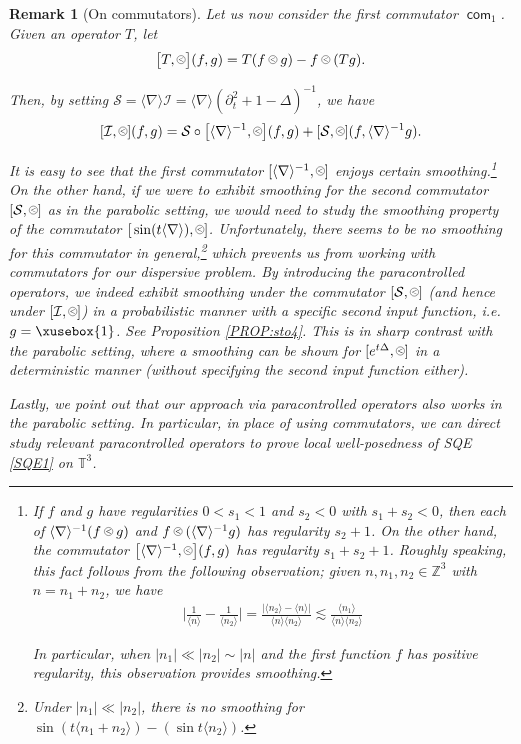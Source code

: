 \documentclass[%
11pt,  reqno]{amsart}
\def\<#1>{\xusebox{#1}}
\newcommand{\pl}{\mathbin{\scaleobj{0.7}{\tikz \draw (0,0) node[shape=circle,draw,inner sep=0pt,minimum size=8.5pt] {\scriptsize $<$};}}}
\newtheorem{remark}[theorem]{Remark}
\newcommand{\1}{\hspace{0.2mm}\text{I}\hspace{0.2mm}}
\newcommand{\noi}{\noindent}
\newcommand{\Z}{\mathbb{Z}}
\newcommand{\T}{\mathbb{T}}
\DeclareMathOperator{\com}{\textsf{com}}
\newcommand{\nb}{\nabla}
\newcommand{\Dl}{\Delta}
\newcommand{\dt}{\partial_t}
\newcommand{\les}{\lesssim}
\newcommand{\jb}[1]
{\langle #1 \rangle}
\renewcommand{\S}{\mathcal{S}}
\newcommand{\I}{\mathcal{I}}
\numberwithin{equation}{section}
\numberwithin{theorem}{section}
\begin{document}
\begin{remark}[On commutators]
Let us now consider the first commutator $\com_1$.
Given an operator $T$, 
let 
\begin{align*}
\big[T, \pl\big](f, g) =T(f\pl g) - f\pl (T g).
\end{align*}

\noi
Then, 
by setting   $\S = \jb{\nb} \I = \jb{\nb} (\dt^2 + 1 - \Dl)^{-1}$, 
we have
\[ [\I, \pl](f, g) = \S \circ \big[\jb{\nb}^{-1}, \pl\big](f, g) + [\S, \pl] (f,  \jb{\nb}^{-1}g).\]

\noi
It is easy to see that the first commutator 
$[ \jb{\nb}^{-1}, \pl]$ enjoys certain smoothing.\footnote{If $f$ and $g$ have regularities $0 < s_1 < 1$ and $s_2<0$ with  $s_1 + s_2 < 0$, 
then each of $\jb{\nb}^{-1}(f \pl g)$ and $f \pl (\jb{\nb}^{-1}g)$
has 
regularity $s_2 + 1$.
On the other hand, the commutator $\big[\jb{\nb}^{-1}, \pl\big](f, g)$
has regularity $s_1 + s_2 + 1$.
Roughly speaking, this fact follows from the following observation;
given $n, n_1, n_2 \in \Z^3$ with  $n = n_1 + n_2$, we have
\begin{align*}
\bigg|\frac{1}{\jb{n}} - \frac{1}{\jb{n_2}}\bigg|
= \frac{\big|\jb{n_2} - \jb{n}\big|}{\jb{n}\jb{n_2}}
\les \frac{\jb{n_1}}{\jb{n}\jb{n_2}}
\end{align*}

\noi
In particular, when $|n_1| \ll |n_2| \sim |n|$
and the first function $f$ has positive regularity, 
this observation provides  smoothing.
}
On the other hand, 
if we were to exhibit smoothing 
for  the second commutator $[\S, \pl]$ as in the parabolic setting, 
we would need to study the smoothing property
of the commutator $[ \,\sin(t \jb{\nb}), \pl]$.
Unfortunately, there seems to be no smoothing
for this commutator in general,\footnote{Under $|n_1| \ll |n_2|$, 
there is no smoothing for
$\sin( t\jb{n_1+n_2}) - (\sin t \jb{n_2})$.
}
which prevents us from working with commutators for our dispersive problem.
By introducing the paracontrolled operators, 
we indeed exhibit smoothing
under 
the commutator $[\S, \pl]$ (and hence under $[\I, \pl]$)
in a probabilistic manner with a specific second input function, i.e.~$g = \<1>$.
 See Proposition \ref{PROP:sto4}.
This is in sharp contrast with the parabolic setting,
where a smoothing can be shown for 
 $[e^{t\Dl}, \pl]$ in a deterministic manner
 (without specifying the second input function either).

Lastly, we point out that our approach
via  paracontrolled operators
also works in the parabolic setting.
In particular, 
in place of using commutators, 
we can direct study relevant  paracontrolled operators
to prove local well-posedness of SQE \eqref{SQE1} on $\T^3$.



\end{remark}
\end{document}
